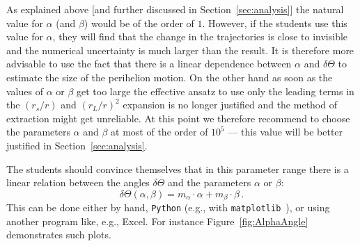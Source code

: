 \documentclass[12pt,ngerman,american]{iopart}
\newcommand{\python}[0]{\texttt{Python}}
\begin{document}
As explained above [and further discussed in Section~\ref{sec:analysis}] the natural value for $\alpha$ (and $\beta$)  would be of the order of $1$.
However, if the students use this value for $\alpha$, they will find that the change in the trajectories is close to invisible and the numerical uncertainty is much larger than the result.
It is therefore more advisable to use the fact that there is a linear dependence between $\alpha$ and $\delta \Theta$ to estimate the size of the perihelion motion.
On the other hand as soon as the values of $\alpha$ or $\beta$ get too large the effective ansatz to use only the leading terms 
in the $(r_s/r)$ and $(r_L/r)^2$ expansion is no longer justified and the method of extraction might get unreliable.
At this point we therefore recommend to choose the parameters  $\alpha$ and $\beta$ at most of the order of $10^5$ --- this
value will be better justified in Section~\ref{sec:analysis}.

The students should convince themselves that in this parameter range there is a linear relation between the angles $\delta \Theta$ and the parameters $\alpha$ or $\beta$:
\begin{equation}\label{eq:theta-linear}
	\delta\Theta (\alpha, \beta) = m_\alpha \cdot \alpha + m_\beta \cdot \beta
	\, .
\end{equation}
This can be done either by hand, \python{} (e.g., with \texttt{matplotlib}~\cite{Matplotlib}), or using another program like, e.g., Excel.
For instance Figure~\ref{fig:AlphaAngle} demonstrates such plots.
\end{document}
